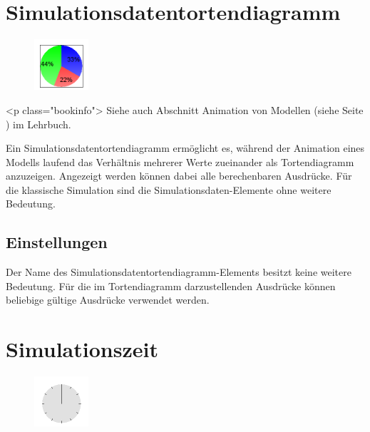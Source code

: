 \section{Simulationsdatentortendiagramm}
\label{ref:ModelElementAnimationPieChart}

\begin{figure}
\vspace{-22pt}
\includegraphics[width=2cm]{imageModelElementAnimationPieChart.png}
\vspace{-22pt}
\end{figure}

<p class="bookinfo">
Siehe auch Abschnitt Animation von Modellen (siehe Seite \pageref{ref:book:5.4.3}) im Lehrbuch.

Ein Simulationsdatentortendiagramm ermöglicht es, während der Animation eines Modells laufend 
das Verhältnis mehrerer Werte zueinander als Tortendiagramm anzuzeigen.
Angezeigt werden können dabei alle berechenbaren Ausdrücke. Für die klassische Simulation sind die
Simulationsdaten-Elemente ohne weitere Bedeutung.

\subsection*{Einstellungen}

Der Name des Simulationsdatentortendiagramm-Elements besitzt keine weitere Bedeutung. Für die im
Tortendiagramm darzustellenden Ausdrücke können beliebige gültige Ausdrücke verwendet werden.


\section{Simulationszeit}
\label{ref:ModelElementAnimationClock}

\begin{figure}
\vspace{-22pt}
\includegraphics[width=2cm]{imageModelElementAnimationClock.png}
\vspace{-22pt}
\end{figure}


